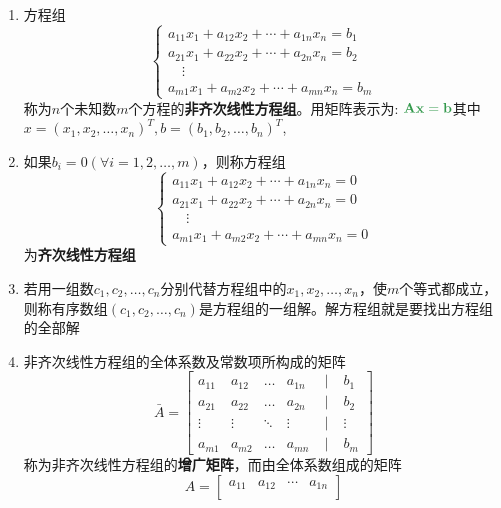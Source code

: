 \documentclass[a4paper,12pt]{article}
\begin{document}
    \begin{enumerate}
        \item 方程组
        \[
            \begin{cases}
                a_{11}x_1 + a_{12}x_2 + \cdots + a_{1n}x_n = b_1 \\
                a_{21}x_1 + a_{22}x_2 + \cdots + a_{2n}x_n = b_2 \\
                \quad \vdots \\
                a_{m1}x_1 + a_{m2}x_2 + \cdots + a_{mn}x_n = b_m
            \end{cases}
        \]
        称为$n$个未知数$m$个方程的\textbf{非齐次线性方程组}。用矩阵表示为: $\mathbf{\color[rgb]{0.2, 0.6, 0.3}{Ax = b}}$其中$x = (x_1, x_2, \dots, x_n)^T, b = (b_1, b_2, \dots, b_n)^T$,
        \item 如果$b_{i} = 0(\forall i = 1,2,\dots,m)$，则称方程组
        \[
            \begin{cases}
                a_{11}x_1 + a_{12}x_2 + \cdots + a_{1n}x_n = 0 \\
                a_{21}x_1 + a_{22}x_2 + \cdots + a_{2n}x_n = 0 \\
                \quad \vdots \\
                a_{m1}x_1 + a_{m2}x_2 + \cdots + a_{mn}x_n = 0
            \end{cases}
        \]
        为\textbf{齐次线性方程组}
        \item 若用一组数$c_1, c_2, \dots, c_n$分别代替方程组中的$x_1, x_2, \dots, x_n$，使$m$个等式都成立，则称有序数组$(c_1, c_2, \dots, c_n)$是方程组的一组解。解方程组就是要找出方程组的全部解
        \item 非齐次线性方程组的全体系数及常数项所构成的矩阵
        \[
            \bar{A} =
            \begin{bmatrix}
                a_{11} & a_{12} & \dots  & a_{1n} & \;\big|\; & b_1    \\
                a_{21} & a_{22} & \dots  & a_{2n} & \;\big|\; & b_2    \\
                \vdots & \vdots & \ddots & \vdots & \;\big|\; & \vdots \\
                a_{m1} & a_{m2} & \dots  & a_{mn} & \;\big|\; & b_m
            \end{bmatrix}
        \]
        称为非齐次线性方程组的\textbf{增广矩阵}，而由全体系数组成的矩阵
        \[
            A =
            \begin{bmatrix}
                a_{11} & a_{12} & \cdots & a_{1n} \\

\end{bmatrix}\]
\end{enumerate}
\end{document}

